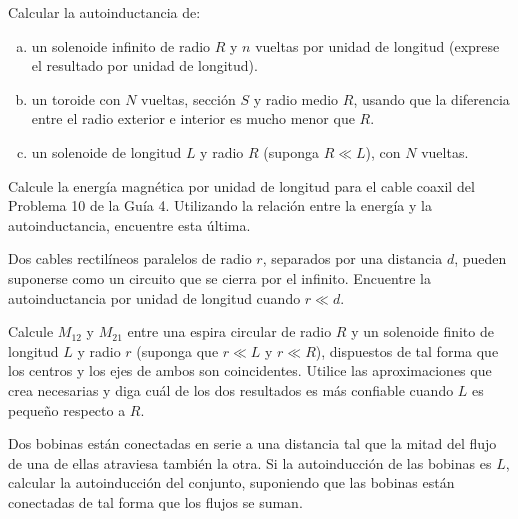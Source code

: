 \documentclass[problemas]{guia}
\begin{document}
\begin{problema}{}
    Calcular la autoinductancia de:
    \begin{enumerate}[(a)]
        \item un solenoide infinito de radio $R$ y $n$ vueltas por unidad de 
            longitud (exprese el resultado por unidad de longitud).
        \item un toroide con $N$ vueltas, sección $S$ y radio medio $R$, usando
            que la diferencia entre el radio exterior e interior es mucho menor
            que $R$.
        \item un solenoide de longitud $L$ y radio $R$ (suponga $R \ll L$), 
            con $N$ vueltas.
    \end{enumerate}
\end{problema} 

\begin{problema}{}
    Calcule la energía magnética por unidad de longitud para el cable coaxil 
    del Problema 10 de la Guía 4. Utilizando la relación entre la energía y la 
    autoinductancia, encuentre esta última.
\end{problema} 

\begin{problema}{}
    Dos cables rectilíneos paralelos de radio $r$, separados por una distancia 
    $d$, pueden suponerse como un circuito que se cierra por el infinito. 
    Encuentre la autoinductancia por unidad de longitud cuando $r \ll d$.
\end{problema} 

\begin{problema}{}
    Calcule $M_{12}$ y $M_{21}$ entre una espira circular de radio $R$ y un 
    solenoide finito de longitud $L$ y radio $r$ (suponga que 
    $r \ll L$ y $r \ll R$), dispuestos de tal forma que los centros y los ejes 
    de ambos son coincidentes. Utilice las aproximaciones que crea necesarias 
    y diga cuál de los dos resultados es más confiable cuando $L$ es pequeño 
    respecto a $R$.
\end{problema} 

\begin{problema}{}
    Dos bobinas están conectadas en serie a una distancia tal que la mitad del 
    flujo de una de ellas atraviesa también la otra. Si la autoinducción de 
    las bobinas es $L$, calcular la autoinducción del conjunto, suponiendo que 
    las bobinas están conectadas de tal forma que los flujos se suman.
\end{problema} 
\end{document}
